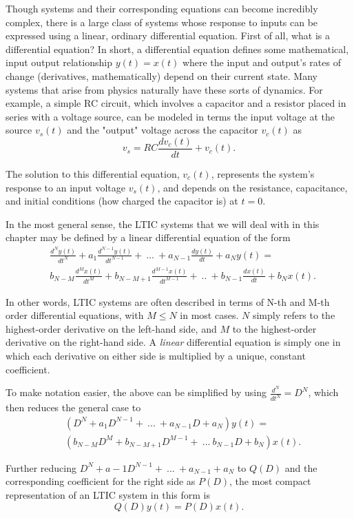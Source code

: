 \documentclass{article}
\begin{document}
Though systems and their corresponding equations can become incredibly complex, there is a large class of systems whose response to inputs can be expressed using a linear, ordinary differential equation. First of all, what is a differential equation? In short, a differential equation defines some mathematical, input output relationship \(y(t) = x(t)\) where the input and output's rates of change (derivatives, mathematically) depend on their current state. Many systems that arise from physics naturally have these sorts of dynamics. For example, a simple RC circuit, which involves a capacitor and a resistor placed in series with a voltage source, can be modeled in terms the input voltage at the source \(v_s(t)\) and the "output" voltage across the capacitor \(v_c(t)\) as 
\[
  v_s = RC \frac{dv_c(t)}{dt} + v_c(t).
\]

The solution to this differential equation, \(v_c(t)\), represents the system's response to an input voltage \(v_s(t)\), and depends on the resistance, capacitance, and initial conditions (how charged the capacitor is) at \(t=0\).

In the most general sense, the LTIC systems that we will deal with in this chapter may be defined by a linear differential equation of the form 
\begin{align*}
	&\frac{d^Ny(t)}{dt^N} + a_1 \frac{d^{N-1}y(t)}{dt^{N-1}} + \ ... \ + a_{N-1}\frac{dy(t)}{dt} + a_Ny(t) = \\
	&b_{N-M}\frac{d^Mx(t)}{dt^M} + b_{N-M+1}\frac{d^{M-1}x(t)}{dt^{M-1}} + \ .. \ + b_{N-1}\frac{dx(t)}{dt}+b_Nx(t).
\end{align*} 

In other words, LTIC systems are often described in terms of N-th and M-th order differential equations, with \(M \leq N\) in most cases. \(N\) simply refers to the highest-order derivative on the left-hand side, and \(M\) to the highest-order derivative on the right-hand side. A \textit{linear} differential equation is simply one in which each derivative on either side is multiplied by a unique, constant coefficient.

To make notation easier, the above can be simplified by using \(\frac{d^N}{dt^N} = D^N\), which then reduces the general case to
\begin{align*}
	&(D^N + a_1D^{N-1} + \ ... \ + a_{N-1}D + a_N)y(t) = \\
	&(b_{N-M}D^M + b_{N-M+1}D^{M-1} + \ ... \ b_{N-1}D+b_N)x(t).
\end{align*}

Further reducing \(D^N + a-1D^{N-1} + \ ... \ + a_{N-1} + a_N\) to \(Q(D)\) and the corresponding coefficient for the right side as \(P(D)\), the most compact representation of an LTIC system in this form is \[
  Q(D)y(t) = P(D)x(t).
\]
\end{document}
